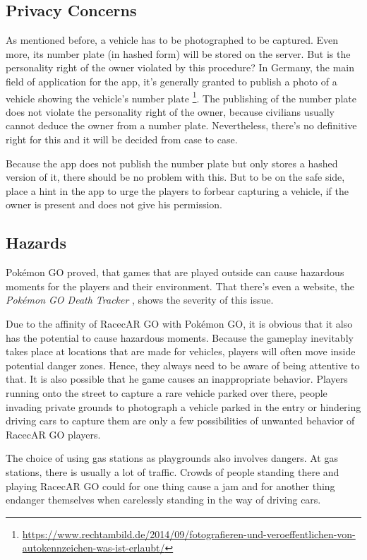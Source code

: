 \subsection{Privacy Concerns}
As mentioned before, a vehicle has to be photographed to be captured. Even more, its number plate (in hashed form) will be stored on the server. But is the personality right of the owner violated by this procedure? In Germany, the main field of application for the app, it's generally granted to publish a photo of a vehicle showing the vehicle's number plate \footnote{\url{https://www.rechtambild.de/2014/09/fotografieren-und-veroeffentlichen-von-autokennzeichen-was-ist-erlaubt/}}. The publishing of the number plate does not violate the personality right of the owner, because civilians usually cannot deduce the owner from a number plate. Nevertheless, there's no definitive right for this and it will be decided from case to case.

Because the app does not publish the number plate but only stores a hashed version of it, there should be no problem with this. But to be on the safe side, place a hint in the app to urge the players to forbear capturing a vehicle, if the owner is present and does not give his permission.

\subsection{Hazards}\label{sec:hazards}
Pok\'{e}mon GO proved, that games that are played outside can cause hazardous moments for the players and their environment. That there's even a website, the \emph{Pok\'{e}mon GO Death Tracker} \citep{PokemonGoDeathTracker}, shows the severity of this issue.

Due to the affinity of RacecAR GO with Pok\'{e}mon GO, it is obvious that it also has the potential to cause hazardous moments. Because the gameplay inevitably takes place at locations that are made for vehicles, players will often move inside potential danger zones. Hence, they always need to be aware of being attentive to that. It is also possible that he game causes an inappropriate behavior. Players running onto the street to capture a rare vehicle parked over there, people invading private grounds to photograph a vehicle parked in the entry or hindering driving cars to capture them are only a few possibilities of unwanted behavior of RacecAR GO players.

The choice of using gas stations as playgrounds also involves dangers. At gas stations, there is usually a lot of traffic. Crowds of people standing there and playing RacecAR GO could for one thing cause a jam and for another thing endanger themselves when carelessly standing in the way of driving cars.

